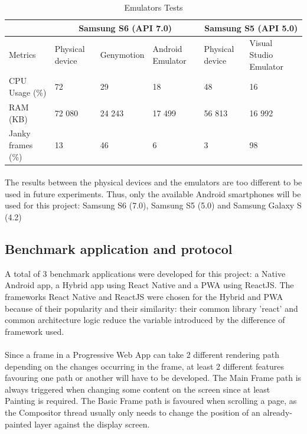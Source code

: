 \documentclass{kththesis}
\begin{document}
\begin{table}[!ht]
    \begin{tabular}{|m{}|m{2cm}|m{2cm}|m{2cm}||m{2cm}|m{}|}
        \hline
         & \multicolumn{3}{c||}{Samsung S6 (API 7.0)} & \multicolumn{2}{|c|}{Samsung S5 (API 5.0)}  \\
         \hline
         Metrics & Physical device & Genymotion & Android Emulator & Physical device & Visual Studio Emulator \\
         \hline
         CPU Usage (\%) & 72 & 29 & 18 & 48 & 16 \\
         \hline
         RAM (KB) & 72 080 & 24 243 & 17 499 & 56 813 & 16 992 \\
         \hline
         Janky frames (\%) & 13 & 46 & 6 & 3 & 98 \\
         \hline
    \end{tabular}
    \caption{Emulators Tests}
    \label{tab:memulators_test}
\end{table}

\paragraph{}
The results between the physical devices and the emulators are too different to be used in future experiments. Thus, only the available Android smartphones will be used for this project: Samsung S6 (7.0), Samsung S5 (5.0) and Samsung Galaxy S (4.2)


    \subsection{Benchmark application and protocol}

A total of 3 benchmark applications were developed for this project: a Native Android app, a Hybrid app using React Native and a PWA using ReactJS. The frameworks React Native and ReactJS were chosen for the Hybrid and PWA because of their popularity  and their similarity: their common library 'react' and common architecture logic reduce the variable introduced by the difference of framework used.

\paragraph{}
Since a frame in a Progressive Web App can take 2 different rendering path depending on the changes occurring in the frame, at least 2 different features favouring one path or another will have to be developed. The Main Frame path is always triggered when changing some content on the screen since at least Painting is required. The Basic Frame path is favoured when scrolling a page, as the Compositor thread usually only needs to change the position of an already-painted layer against the display screen. 
\end{document}
